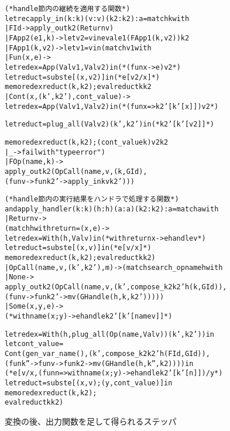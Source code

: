 \begin{figure}
\begin{spacing}{0.9}
\begin{alltt}
(* handle 節内の継続を適用する関数 *)
let rec apply_in (k : k) (v : v) (k2 : k2) : a = match k with
  | FId -> apply_out k2 (Return v)
  | FApp2 (e1, k) -> let v2 = v in eval e1 (FApp1 (k, v2)) k2
  | FApp1 (k, v2) -> let v1 = v in (match v1 with
    | Fun (x, e) ->
       \colorbox{lg}{let redex = App (Val v1, Val v2) in  (* (fun x -> e) v2 *)}
       let reduct = subst e [(x, v2)] in    \colorbox{lg}{(* e[v2/x] *)}
       \colorbox{lg}{memo redex reduct (k, k2);} eval reduct k k2
    | Cont (x, \colorbox{lg}{(k', k2'),} cont_value) ->
       \colorbox{lg}{let redex = App (Val v1, Val v2) in  (* (fun x => k2'[k'[x]]) v2 *)}
\end{alltt}
\vspace{-26pt}
\begin{alltt}
       \colorbox{lg}{let reduct = plug_all (Val v2) (k', k2') in  (* k2'[k'[v2]] *)}
\end{alltt}
\vspace{-26pt}
\begin{alltt}
       \colorbox{lg}{memo redex reduct (k, k2);} (cont_value k) v2 k2
    | _ -> failwith "type error")
  | FOp (name, k) ->
    apply_out k2 (OpCall (name, v, (k, GId),
      (fun v -> fun k2' -> apply_in k v k2')))

(* handle 節内の実行結果をハンドラで処理する関数 *)
and apply_handler (k : k) (h : h) (a : a) (k2 : k2) : a = match a with
  | Return v ->
    (match h with \LBR{}return = (x, e)\RBR ->
      \colorbox{lg}{let redex = With (h, Val v) in    (* with \LBR{}return x -> e\RBR handle v *)}
      let reduct = subst e [(x, v)] in  \colorbox{lg}{(* e[v/x] *)}
      \colorbox{lg}{memo redex reduct (k, k2);} eval reduct k k2)
  | OpCall (name, v, \colorbox{lg}{(k', k2'),} m) -> (match search_op name h with
    | None ->
      apply_out k2 (OpCall (name, v, \colorbox{lg}{(k', compose_k2 k2' h (k, GId)),}
        (fun v -> fun k2' -> m v (GHandle (h, k, k2')))))
    | Some (x, y, e) ->
      \colorbox{lg}{(* with \LBR{}name(x; y) -> e\RBR handle k2'[k'[name v]] *)}
\end{alltt}
\vspace{-26pt}
\begin{alltt}
      \colorbox{lg}{let redex = With (h, plug_all (Op (name, Val v)) (k', k2')) in}
      let cont_value =
        Cont (\colorbox{lg}{gen_var_name (),} (k', compose_k2 k2' h (FId, GId)),
          (fun k'' -> fun v -> fun k2 -> m v (GHandle (h, k'', k2)))) in
      \colorbox{lg}{(* e[v/x, (fun n => with \LBR{}name(x; y) -> e\RBR handle k2'[k'[n]]) /y *)}
      let reduct = subst e [(x, v); (y, cont_value)] in
      \colorbox{lg}{memo redex reduct (k, k2);}
      eval reduct k k2)
\end{alltt}
\caption{変換の後、出力関数を足して得られるステッパ}
\label{figure:5memo}
\end{spacing}
\end{figure}

